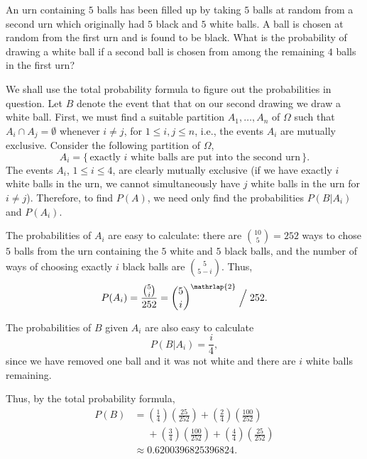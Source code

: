 \begin{problem}[Handout 4, \# 13]
  An urn containing \(5\) balls has been filled up by taking \(5\) balls at
  random from a second urn which originally had \(5\) black and \(5\) white
  balls. A ball is chosen at random from the first urn and is found to be
  black. What is the probability of drawing a white ball if a second ball
  is chosen from among the remaining \(4\) balls in the first urn?
\end{problem}
\begin{solution}
  We shall use the total probability formula to figure out the
  probabilities in question. Let \(B\) denote the event that that on our
  second drawing we draw a white ball. First, we must find a suitable
  partition \(A_1,\dotsc,A_n\) of \(\Omega\) such that
  \(A_i\cap A_j=\emptyset\) whenever \(i\neq j\), for \(1\leq i,j\leq n\),
  i.e., the events \(A_i\) are mutually exclusive. Consider the following
  partition of \(\Omega\),
  \[
    A_i=\bigl\{\,\text{exactly \(i\) white balls are put into the second
      urn}\,\bigr\}.
  \]
  The events \(A_i\), \(1\leq i\leq 4\), are clearly mutually exclusive (if
  we have exactly \(i\) white balls in the urn, we cannot simultaneously
  have \(j\) white balls in the urn for \(i\neq j\)). Therefore, to find
  \(P(A)\), we need only find the probabilities \(P(B|A_i)\) and
  \(P(A_i)\).

  The probabilities of \(A_i\) are easy to calculate: there are
  \(\binom{10}{5}=252\) ways to chose \(5\) balls from the urn containing
  the \(5\) white and \(5\) black balls, and the number of ways of choosing
  exactly \(i\) black balls are \(\binom{5}{5-i}\). Thus,
  \[
    P(A_i)=\frac{\binom{5}{i}}{252}
    =\binom{5}{i}^{\mathrlap{2}}\Bigm/252.
  \]

  The probabilities of \(B\) given \(A_i\) are also easy to calculate
  \[
    P(B|A_i)=\frac{i}{4},
  \]
  since we have removed one ball and it was not white and there are \(i\)
  white balls remaining.

  Thus, by the total probability formula,
  \begin{align*}
    P(B)
    &=\left(\frac{1}{4}\right)\left(\frac{25}{252}\right)+
      \left(\frac{2}{4}\right)\left(\frac{100}{252}\right)\\
    &\phantom{{}={}}+\left(\frac{3}{4}\right)\left(\frac{100}{252}\right)+
      \left(\frac{4}{4}\right)\left(\frac{25}{252}\right)\\
    &\approx\num{0.6200396825396824}.
  \end{align*}
\end{solution}
\newpage


